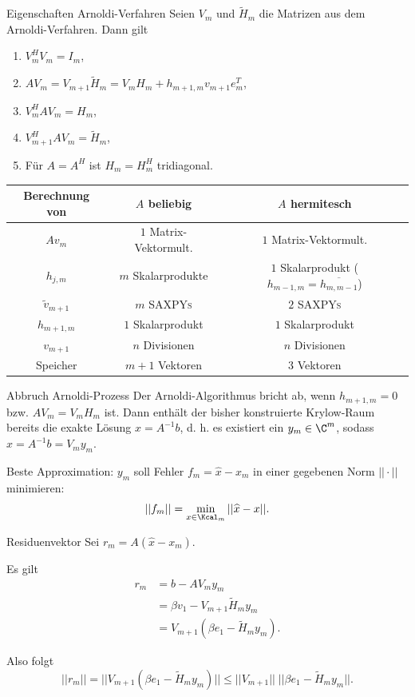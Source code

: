 \begin{karte}{Eigenschaften Arnoldi-Verfahren}
    Seien \(V_m\) und \( \tilde{H}_m \) die Matrizen aus dem Arnoldi-Verfahren. 
    Dann gilt 
    \begin{enumerate}
        \item \( V_m^H V_m = I_m \),
        \item \( A V_m = V_{m+1} \tilde{H}_m = V_m H_m + h_{m+1,m} v_{m+1} e_m^T \),
        \item \( V_m^H A V_m = H_m \),
        \item \( V_{m+1}^H A V_m = \tilde{H}_m \),
        \item Für \( A = A^H \) ist \( H_m = H_m^H \) tridiagonal.
    \end{enumerate}
    \begin{tabular}{|c|c|c|}
        \hline
        Berechnung von & \(A\) beliebig & \(A\) hermitesch \\
        \hline
        \(A v_m\) & \(1\) Matrix-Vektormult. & \(1\) Matrix-Vektormult. \\
        \( h_{j,m} \) & \(m\) Skalarprodukte & \(1\) Skalarprodukt (\(h_{m-1,m} = \overline{h_{m,m-1}}\)) \\
        \( \tilde{v}_{m+1} \) & \(m\) \textsc{SAXPYs} & \(2\) \textsc{SAXPYs} \\
        \( h_{m+1,m} \) & \(1\) Skalarprodukt & \(1\) Skalarprodukt \\
        \( v_{m+1} \) & \(n\) Divisionen & \(n\) Divisionen \\\hline
        Speicher & \(m+1\) Vektoren & \(3\) Vektoren\\
        \hline
    \end{tabular}
\end{karte}

\begin{karte}{Abbruch Arnoldi-Prozess}
    Der Arnoldi-Algorithmus bricht ab, wenn \( h_{m+1,m} = 0 \) 
    bzw. \( A V_m = V_m H_m \) ist. Dann enthält der bisher konstruierte 
    Krylow-Raum bereits die exakte Lösung \( \widehat{x} = A^{-1}b \), d. h. 
    es existiert ein \( y_m \in \C^m \), sodass \( \widehat{x} = A^{-1}b = V_m y_m \).

    Beste Approximation: \(y_m\) soll Fehler \( f_m = \widehat{x} - x_m \)
    in einer gegebenen Norm \(||\cdot||\) minimieren: 
    \[ ||f_m|| = \min_{x\in \Kcal_m} ||\widehat{x} - x||. \]
\end{karte}

\begin{karte}{Residuenvektor}
    Sei \( r_m = A(\widehat{x} - x_m) \). 

    Es gilt \begin{align*}
        r_m &= b - A V_m y_m \\ 
        &= \beta v_1 - V_{m+1} \tilde{H}_m y_m \\
        &= V_{m+1} (\beta e_1 - \tilde{H}_m y_m).
    \end{align*}

    Also folgt 
    \[ ||r_m|| = ||V_{m+1}(\beta e_1 - \tilde{H}_m y_m)|| \leq ||V_{m+1}|| \;||\beta e_1 - \tilde{H}_m y_m||. \]
\end{karte}

